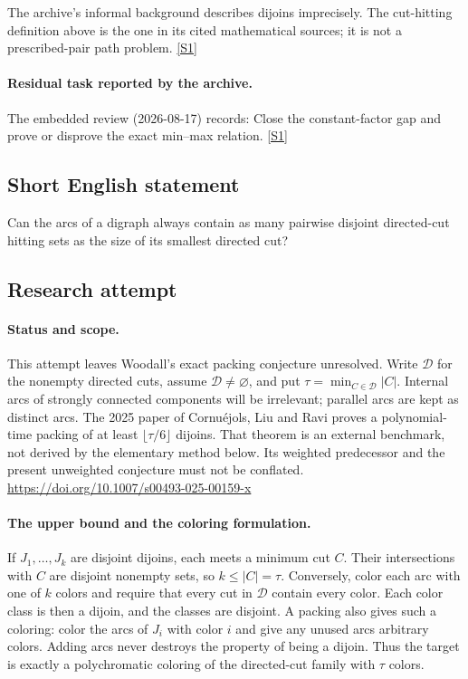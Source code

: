 \documentclass[11pt,a4paper]{article}
\newcommand{\sref}[2]{\hyperlink{source:#1:#2}{[S#2]}}
\begin{document}
The archive’s informal background describes dijoins imprecisely. The cut-hitting definition above is the one in its cited mathematical sources; it is not a prescribed-pair path problem. \sref{statement}{1}

\paragraph{Residual task reported by the archive.}

The embedded review (2026-08-17) records: Close the constant-factor gap and prove or disprove the exact min--max relation. \sref{statement}{1}

\subsection{Short English statement}

Can the arcs of a digraph always contain as many pairwise disjoint directed-cut hitting sets as the size of its smallest directed cut?

\subsection{Research attempt}
\paragraph{Status and scope.}
This attempt leaves Woodall's exact packing conjecture unresolved.
Write $\mathcal D$ for the nonempty directed cuts, assume
$\mathcal D\ne\varnothing$, and put
$\tau=\min_{C\in\mathcal D}|C|$. Internal arcs of strongly connected
components will be irrelevant; parallel arcs are kept as distinct arcs.
The 2025 paper of Cornu\'ejols, Liu and Ravi proves a polynomial-time
packing of at least $\lfloor\tau/6\rfloor$ dijoins. That theorem is an
external benchmark, not derived by the elementary method below.
Its weighted predecessor and the present unweighted conjecture must not
be conflated. \url{https://doi.org/10.1007/s00493-025-00159-x}

\paragraph{The upper bound and the coloring formulation.}
If $J_1,\ldots,J_k$ are disjoint dijoins, each meets a minimum cut $C$.
Their intersections with $C$ are disjoint nonempty sets, so $k\leq|C|=\tau$.
Conversely, color each arc with one of $k$ colors and require that every
cut in $\mathcal D$ contain every color. Each color class is then a
dijoin, and the classes are disjoint. A packing also gives such a
coloring: color the arcs of $J_i$ with color $i$ and give any unused
arcs arbitrary colors. Adding arcs never destroys the property of
being a dijoin. Thus the target is exactly a polychromatic coloring
of the directed-cut family with $\tau$ colors.
\end{document}
